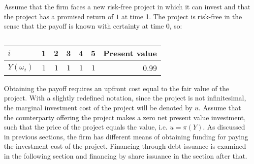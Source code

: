 \documentclass[main.tex]{subfiles}
\begin{document}
    Assume that the firm faces a new risk-free project in which it can invest
    and that the project has a promised return of $\num{1}$ at time 1.
    The project is risk-free in the sense that the payoff is known with certainty at time 0, so:
        \begin{table}[H]
            \centering
            \begin{tabular}{l|rrrrr||r}
                $i$ & 1 & 2 & 3 & 4 & 5 & Present value\\
                \hline
                $Y(\omega_{i})$ & 
                    $\num{1}$ & $\num{1}$ & $\num{1}$ & $\num{1}$ & $\num{1}$ & \num{0.99}
            \end{tabular}
            \caption{}
            \label{tbl:single-period-simple-derivative-payoff}
        \end{table}
    Obtaining the payoff requires an upfront cost equal to the fair value of the project.
    With a slightly redefined notation, since the project is not infinitesimal,
    the marginal investment cost of the project will be denoted by $u$.
    Assume that the counterparty offering the project makes a zero net present value investment, 
    such that the price of the project equals the value, i.e. $u = \pi(Y)$.
    As discussed in previous sections, the firm has different means of obtaining funding
    for paying the investment cost of the project.
    Financing through debt issuance is examined in the following section 
    and financing by share issuance in the section after that.
\end{document}
